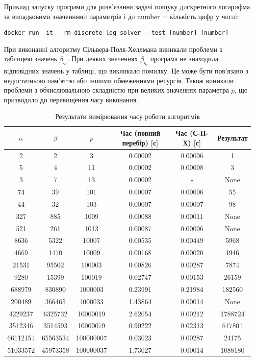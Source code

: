 \documentclass[12pt]{article}
\begin{document}
Приклад запуску програми для розв’язання задачі пошуку дискретного логарифма за випадковими значеннями параметрів і до number = кількість цифр у числі:

\begin{verbatim}
docker run -it --rm discrete_log_solver --test [number] [number]
\end{verbatim}

При виконанні алгоритму Сільвера-Поля-Хеллмана виникали проблеми з таблицею значень \( \beta_{q_i} \). При деяких значеннях \( \beta_{q_i} \) програма не знаходила відповідних значень у таблиці, що викликало помилку. Це може бути пов'язано з недостатньою пам'яттю або іншими обмеженнями ресурсів. Також виникали проблеми з обчислювальною складністю при великих значеннях параметра \( p \), що призводило до перевищення часу виконання.

\begin{table}[h]
\centering
\begin{tabular}{|c|c|c|c|c|c|}
\hline
\(\alpha\) & \(\beta\) & \(p\) & Час (повний перебір) [с] & Час (С-П-Х) [с] & Результат \\ \hline
2 & 2 & 3 & 0.00002 & 0.00006 & 1 \\ \hline
5 & 4 & 11 & 0.00002 & 0.00008 & 3 \\ \hline
3 & 7 & 13 & 0.00002 & - & None \\ \hline
74 & 39 & 101 & 0.00007 & 0.00006 & 55 \\ \hline
44 & 32 & 103 & 0.00007 & 0.00007 & 98 \\ \hline
327 & 885 & 1009 & 0.00088 & 0.00011 & None \\ \hline
521 & 261 & 1013 & 0.00087 & 0.00006 & None \\ \hline
8636 & 5322 & 10007 & 0.00535 & 0.00449 & 5968 \\ \hline
4669 & 1470 & 10009 & 0.00168 & 0.00020 & 1946 \\ \hline
21531 & 95502 & 100003 & 0.00826 & 0.00287 & 7874 \\ \hline
9280 & 15399 & 100019 & 0.02747 & 0.00153 & 26159 \\ \hline
688979 & 830890 & 1000003 & 0.23991 & 0.21984 & 182560 \\ \hline
200489 & 366465 & 1000033 & 1.43864 & 0.00014 & None \\ \hline
4229237 & 6325732 & 10000019 & 2.62054 & 0.00212 & 1788724 \\ \hline
3512346 & 3514593 & 10000079 & 0.90222 & 0.02313 & 647801 \\ \hline
66112151 & 65563534 & 100000007 & 0.03023 & 0.00287 & 24175 \\ \hline
51033572 & 45973358 & 100000037 & 1.73027 & 0.00014 & 1088180 \\ \hline
\end{tabular}
\caption{Результати вимірювання часу роботи алгоритмів}
\end{table}
\end{document}

